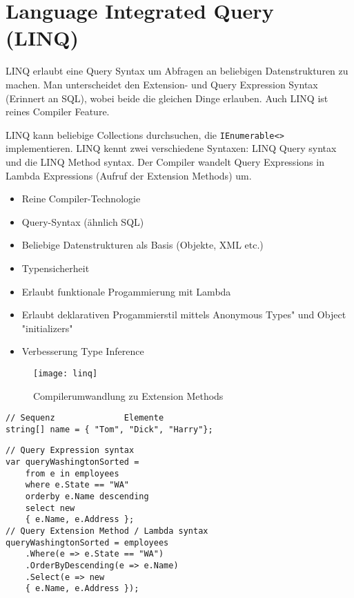 \section{Language Integrated Query (LINQ)}
LINQ erlaubt eine Query Syntax um Abfragen an beliebigen Datenstrukturen zu machen. Man unterscheidet den Extension- und Query Expression Syntax (Erinnert an SQL), wobei beide die gleichen Dinge erlauben. Auch LINQ ist reines Compiler Feature.

LINQ kann beliebige Collections durchsuchen, die \lstinline{IEnumerable<>} implementieren. LINQ kennt zwei verschiedene Syntaxen: LINQ Query syntax und die LINQ Method syntax. Der Compiler wandelt Query Expressions in Lambda Expressions (Aufruf der Extension Methods) um.



\begin{itemize}
	\itemsep -0.5em 
	\item Reine Compiler-Technologie
	\item Query-Syntax (ähnlich SQL)
	\item Beliebige Datenstrukturen als Basis (Objekte, XML etc.)
	\item Typensicherheit
	\item Erlaubt funktionale Progammierung mit Lambda
	\item Erlaubt deklarativen Progammierstil mittels Anonymous Types" und Object "initializers"
	\item Verbesserung Type Inference
\end{itemize}

\begin{figure}[h!]
	\centering
	\texttt{[image: linq]}
  \caption{Compilerumwandlung zu Extension Methods}
\end{figure}

\begin{lstlisting}
// Sequenz				Elemente
string[] name = { "Tom", "Dick", "Harry"};
\end{lstlisting}

\begin{lstlisting}
// Query Expression syntax
var queryWashingtonSorted =
    from e in employees
    where e.State == "WA"
    orderby e.Name descending
    select new
    { e.Name, e.Address };
// Query Extension Method / Lambda syntax
queryWashingtonSorted = employees
    .Where(e => e.State == "WA")
    .OrderByDescending(e => e.Name)
    .Select(e => new
    { e.Name, e.Address });
\end{lstlisting}

